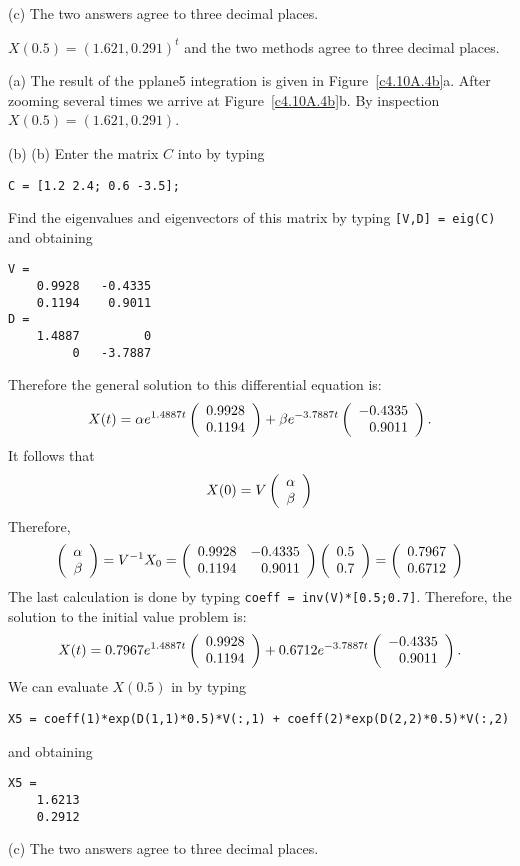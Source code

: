 (c)  The two answers agree to three decimal places.

\begin{figure}[htb]
                       \centerline{%
                       }
\end{figure}



 \ans $X(0.5) = (1.621,0.291)^t$ and the two methods agree to three 
decimal places.

\soln (a) The result of the {\sf pplane5} integration is given in 
Figure~\ref{c4.10A.4b}a. After zooming several times we arrive at
Figure~\ref{c4.10A.4b}b.  By inspection $X(0.5)=(1.621,0.291)$.

(b) (b)  Enter the matrix $C$ into \Matlab by typing
\begin{verbatim}
C = [1.2 2.4; 0.6 -3.5];
\end{verbatim}
Find the eigenvalues and eigenvectors of this matrix by typing {\tt [V,D] = eig(C)}
and obtaining
\begin{verbatim}
V =
    0.9928   -0.4335
    0.1194    0.9011
D =
    1.4887         0
         0   -3.7887
\end{verbatim}
Therefore the general solution to this differential equation is:
\[
X(t) = \alpha e^{1.4887 t}\left(\begin{array}{r} 0.9928 \\ 0.1194\end{array}\right) +
\beta e^{-3.7887 t}\left(\begin{array}{r} -0.4335 \\ 0.9011\end{array}\right).
\]
It follows that 
\[
X(0) = V \left(\begin{array}{r} \alpha \\ \beta\end{array}\right)
\]
Therefore,
\[
\left(\begin{array}{r} \alpha \\ \beta\end{array}\right) = V^{-1} X_0 = 
\left(\begin{array}{rr} 0.9928 & -0.4335\\ 0.1194 &0.9011\end{array}\right)\left(\begin{array}{r} 0.5 \\ 0.7\end{array}\right) = \left(\begin{array}{r} 0.7967 \\ 0.6712\end{array}\right)
\]
The last calculation is done by typing {\tt coeff = inv(V)*[0.5;0.7]}. 
Therefore, the solution to the initial value problem is:
\[
X(t) = 0.7967e^{1.4887 t}\left(\begin{array}{r} 0.9928 \\ 0.1194\end{array}\right) +
0.6712e^{-3.7887 t}\left(\begin{array}{r} -0.4335 \\ 0.9011\end{array}\right).
\]
We can evaluate $X(0.5)$ in \Matlab by typing
\begin{verbatim}
X5 = coeff(1)*exp(D(1,1)*0.5)*V(:,1) + coeff(2)*exp(D(2,2)*0.5)*V(:,2)
\end{verbatim}
and obtaining
\begin{verbatim}
X5 =
    1.6213
    0.2912
\end{verbatim}

(c)  The two answers agree to three decimal places.


\begin{figure}[htb]
                       \centerline{%
                       }
\end{figure}


